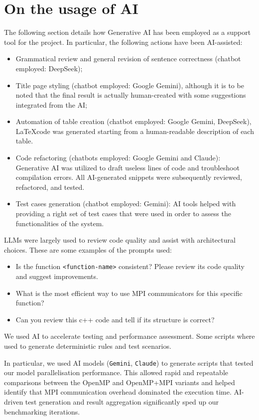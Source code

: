 \documentclass{article}
\begin{document}
\clearpage
\section{On the usage of AI}
The following section details how Generative AI has been employed as a support tool for the project. In particular, the following actions have been AI-assisted: 
\begin{itemize}
    \item Grammatical review and general revision of sentence correctness (chatbot employed: DeepSeek);
    \item Title page styling (chatbot employed: Google Gemini), although it is to be noted that the final result is actually human-created with some suggestions integrated from the AI;
    \item Automation of table creation (chatbot employed: Google Gemini, DeepSeek), \LaTeX code was generated starting from a human-readable description of each table.
    \item Code refactoring (chatbots employed: Google Gemini and Claude): Generative AI was utilized to draft useless lines of code and troubleshoot compilation errors. All AI-generated snippets were subsequently reviewed, refactored, and tested.
    \item Test cases generation (chatbot employed: Gemini): AI tools helped with providing a right set of test cases that were used in order to assess the functionalities of the system.  
\end{itemize}

LLMs were largely used to review code quality and assist with architectural choices. These are some examples of the prompts used:

\begin{itemize}
    \item Is the function \verb|<function-name>| consistent? Please review its code quality and suggest improvements.
    \item What is the most efficient way to use MPI communicators for this specific function?
    \item Can you review this c++ code and tell if its structure is correct?
\end{itemize}

We used AI to accelerate testing and performance assessment. Some scripts where used to generate deterministic rules and test scenarios.

In particular, we used AI models (\texttt{Gemini}, \texttt{Claude}) to generate scripts that tested our model parallelisation performance. This allowed rapid and repeatable comparisons between the OpenMP and OpenMP+MPI variants and helped identify that MPI communication overhead dominated the execution time. AI-driven test generation and result aggregation significantly sped up our benchmarking iterations.
\end{document}
